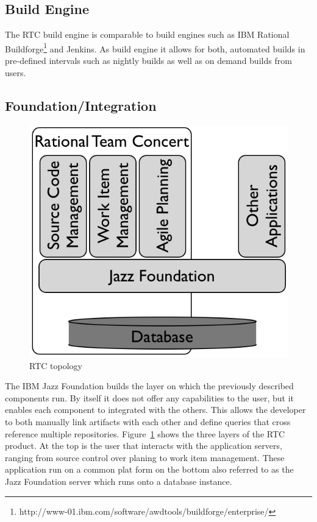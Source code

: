 \subsection{Build Engine}
The RTC build engine is comparable to build engines such as IBM Rational Buildforge\footnote{http://www-01.ibm.com/software/awdtools/buildforge/enterprise/} and Jenkins.
As build engine it allows for both, automated builds in pre-defined intervals such as nightly builds as well as on demand builds from users.

\subsection{Foundation/Integration}
\begin{figure}[t]
\centering
\includegraphics[width=.8\textwidth]{figures/meet-rtc.tex/rtc-topology}
\caption{RTC topology}
\label{fig:rtctopology}
\end{figure}
The IBM Jazz Foundation builds the layer on which the previously described components run.
By itself it does not offer any capabilities to the user, but it enables each component to integrated with the others. 
This allows the developer to both manually link artifacts with each other and define queries that cross reference multiple repositories.
Figure~\ref{fig:rtctopology} shows the three layers of the RTC product.
At the top is the user that interacts with the application servers, ranging from source control over planing to work item management.
These application run on a common plat form on the bottom also referred to as the Jazz Foundation server which runs onto a database instance.

